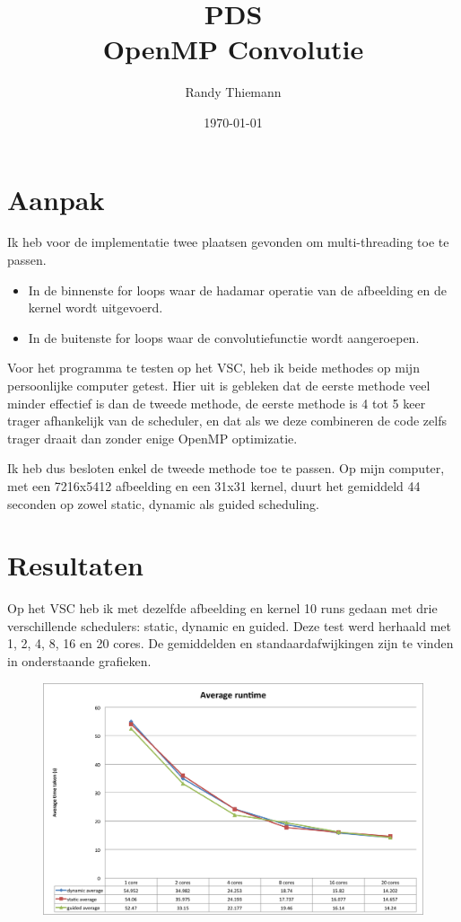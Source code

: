 \documentclass[a4paper,11pt]{article}
\begin{document}
\author{Randy Thiemann} 
\title{PDS \\ OpenMP Convolutie} 
\date{\today}
\maketitle

\section{Aanpak}
Ik heb voor de implementatie twee plaatsen gevonden om multi-threading toe te
passen. 

\begin{itemize}
    \item In de binnenste for loops waar de hadamar operatie van de afbeelding 
        en de kernel wordt uitgevoerd.
    \item In de buitenste for loops waar de convolutiefunctie wordt aangeroepen.
\end{itemize}

Voor het programma te testen op het VSC, heb ik beide methodes op mijn
persoonlijke computer getest. Hier uit is gebleken dat de eerste methode veel
minder effectief is dan de tweede methode, de eerste methode is 4 tot 5 keer 
trager afhankelijk van de scheduler, en dat als we deze combineren de code
zelfs trager draait dan zonder enige OpenMP optimizatie.

Ik heb dus besloten enkel de tweede methode toe te passen. Op mijn computer, met
een 7216x5412 afbeelding en een 31x31 kernel, duurt het gemiddeld 44 seconden op
zowel static, dynamic als guided scheduling.

\section{Resultaten}
Op het VSC heb ik met dezelfde afbeelding en kernel 10 runs gedaan met drie
verschillende schedulers: static, dynamic en guided. Deze test werd herhaald met 
1, 2, 4, 8, 16 en 20 cores. De gemiddelden en standaardafwijkingen zijn te
vinden in onderstaande grafieken.

\begin{figure}[h!]
    \centering
    \includegraphics[width=\textwidth]{average}
\end{figure}
\end{document}
